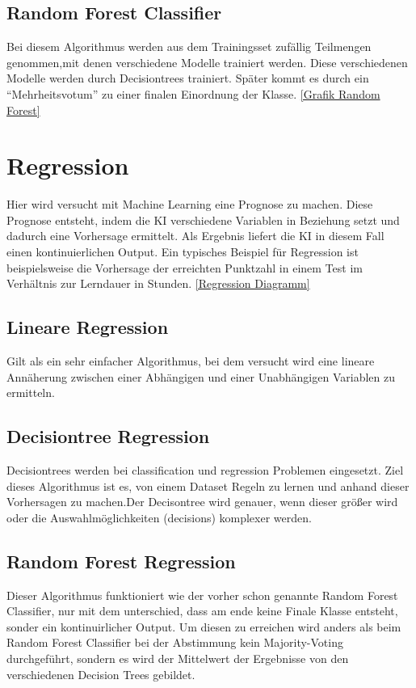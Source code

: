 \subsection{Random Forest Classifier}
\label{sec:RFC}
Bei diesem Algorithmus  werden aus dem Trainingsset zufällig Teilmengen genommen,mit denen verschiedene Modelle trainiert werden.\cite[p.~256]{MB} Diese verschiedenen Modelle werden durch Decisiontrees trainiert. Später kommt es durch ein “Mehrheitsvotum” zu einer finalen Einordnung der Klasse. \cite{MED} \hyperlink{einführungMachineLearning}{[Grafik Random Forest]}

\section{Regression}
\label{sec:regression}
Hier wird versucht mit Machine Learning eine Prognose zu machen. Diese Prognose entsteht, indem die KI verschiedene Variablen in Beziehung setzt und dadurch eine Vorhersage ermittelt. Als Ergebnis liefert die KI in diesem Fall einen kontinuierlichen Output.\cite[p.~4.]{WML}  Ein typisches Beispiel für Regression ist beispielsweise die Vorhersage der erreichten Punktzahl in einem Test im Verhältnis zur Lerndauer in Stunden. \hyperlink{chap:einführungMachineLearning}{[Regression Diagramm]}

\subsection{Lineare Regression}
\label{sec:lineareRegression}
Gilt als ein sehr einfacher Algorithmus, bei dem versucht wird eine lineare Annäherung zwischen einer Abhängigen und einer Unabhängigen Variablen zu ermitteln.\cite[p.~100.]{WML}  


\subsection{Decisiontree Regression}
\label{sec:decisiontreeRegression}
Decisiontrees werden bei classification und regression Problemen eingesetzt. Ziel dieses Algorithmus ist es, von einem Dataset Regeln zu lernen und anhand dieser Vorhersagen zu machen.Der Decisontree wird genauer, wenn dieser größer wird oder die Auswahlmöglichkeiten (decisions) komplexer werden.\cite{SKLT}

\subsection{Random Forest Regression}
\label{sec:randomForestRegression}
Dieser Algorithmus funktioniert wie der vorher schon genannte Random Forest Classifier, nur mit dem unterschied, dass am ende keine Finale Klasse entsteht, sonder ein kontinuirlicher Output. Um diesen zu erreichen wird anders als beim Random Forest Classifier bei der Abstimmung kein Majority-Voting durchgeführt, sondern es wird der Mittelwert der Ergebnisse von den verschiedenen Decision Trees gebildet.

